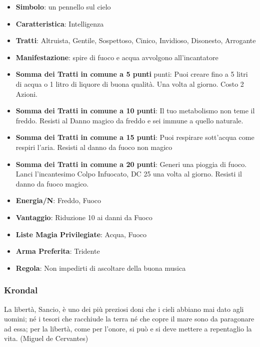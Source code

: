 \begin{multicols}{2}
\begin{itemize}[leftmargin=*] \setlength{\itemsep}{0pt}
\item \textbf{Simbolo}: un pennello sul cielo
\item \textbf{Caratteristica}: Intelligenza
\item \textbf{Tratti}: Altruista, Gentile, Sospettoso, Cinico, Invidioso, Disonesto, Arrogante
\item \textbf{Manifestazione}: spire di fuoco e acqua avvolgono all'incantatore
\item \textbf{Somma dei Tratti in comune a 5 punti} punti: Puoi creare fino a 5 litri di acqua o 1 litro di liquore di buona qualità. Una volta al giorno. Costo 2 Azioni.
\item \textbf{Somma dei Tratti in comune a 10 punti}: Il tuo metabolismo non teme il freddo. Resisti al Danno magico da freddo e sei immune a quello naturale.
\item \textbf{Somma dei Tratti in comune a 15 punti}: Puoi respirare sott'acqua come respiri l'aria. Resisti al danno da fuoco non magico
\item \textbf{Somma dei Tratti in comune a 20 punti}: Generi una pioggia di fuoco. Lanci l'incantesimo Colpo Infuocato, DC 25 una volta al giorno. Resisti il danno da fuoco magico.
\item \textbf{Energia/N}: Freddo, Fuoco
\item \textbf{Vantaggio}: Riduzione 10 ai danni da Fuoco
\item \textbf{Liste Magia Privilegiate}: Acqua, Fuoco
\item \textbf{Arma Preferita}: Tridente
\item \textbf{Regola}: Non impedirti di ascoltare della buona musica
\end{itemize}

\subsubsection{Krondal}\label{krondal}\hypertarget{krondal}{}

\begin{enfasi}{
La libertà, Sancio, è uno dei più preziosi doni che i cieli abbiano mai dato agli uomini; né i tesori che racchiude la terra né che copre il mare sono da paragonare ad essa; per la libertà, come per l'onore, si può e si deve mettere a repentaglio la vita. (Miguel de Cervantes)
}\end{enfasi}


\end{multicols}
